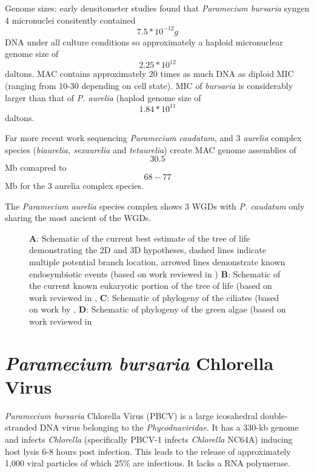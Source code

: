 Genome sizes: early densitometer studies found that \textit{Paramecium bursaria} syngen 4 
micronuclei consitently contained \[ 7.5*10^{-12}g \] DNA under all culture conditions so 
approximately a haploid micronuclear genome size of \[ 2.25*10^{12}\] daltons.
MAC contains approximately 20 times as much DNA as diploid MIC (ranging from 10-30
depending on cell state).
MIC of \textit{bursaria} is considerably larger than that of \textit{P. aurelia}
(haplod genome size of \[ 1.84*10^{11} \] daltons.
\citep{Cullis1972}

Far more recent work sequencing \textit{Paramecium caudatum}, 
and 3 \textit{aurelia} complex species (\textit{biaurelia, sexaurelia} and \textit{tetaurelia})
create MAC genome assemblies of \[30.5\] Mb comapred to \[68-77\] Mb for the 3 aurelia complex species.
\citep{McGrath2014}


The \textit{Paramecium aurelia} species complex shows 3 WGDs with \textit{P. caudatum}
only sharing the most ancient of the WGDs.

\citep{McGrath2014}




\begin{figure}

    \caption{\textbf{A}: Schematic of the current best estimate of the tree of life demonstrating the 2D and 3D hypotheses,
dashed lines indicate multiple potential branch location, arrowed lines demonstrate known endosymbiotic events (based on work reviewed in \citep{Gribaldo2010})
\textbf{B}: Schematic of the current known eukaryotic portion of the tree of life (based on work reviewed in \citep{Burki2014,Adl2013},
\textbf{C}: Schematic of phylogeny of the ciliates (based on work by \citep{Bachvaroff2011,},
\textbf{D}: Schematic of phylogeny of the green algae (based on work reviewed in \citep{Leliaert2012,}}
\end{figure}

\section{\textit{Paramecium bursaria} Chlorella Virus}

\textit{Paramecium bursaria} Chlorella Virus (PBCV) is a large icosahedral double-stranded DNA virus belonging to 
the \textit{Phycodnaviridae}.  It has a 330-kb genome and infects \textit{Chlorella} 
(specifically PBCV-1 infects \textit{Chlorella} NC64A) inducing host lysis 6-8 hours post infection.
This leads to the release of approximately 1,000 viral particles of which 25\% are infectious. 
It lacks a RNA polymerase. \citep{Yanai-Balser2010}

